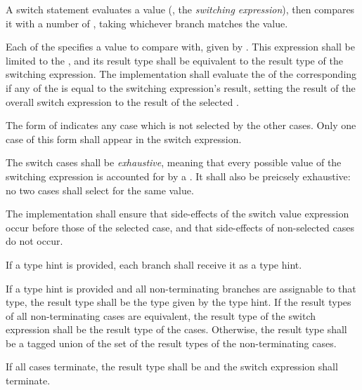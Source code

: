 \specsubsubitem
A switch statement evaluates a value (, the
\textit{switching expression}), then compares it with a number of
, taking whichever branch matches the value.

\specsubsubitem
Each of the  specifies a value to compare with, given
by . This expression shall be limited to the
, and its result type shall be
equivalent to the result type of the switching expression. The implementation
shall evaluate the  of the corresponding
 if any of the  is equal to
the switching expression's result, setting the result of the overall switch
expression to the result of the selected .

\specsubsubitem
The \terminal{*} form of  indicates any case which is
not selected by the other cases. Only one case of this form shall appear in the
switch expression.

\specsubsubitem
The switch cases shall be \textit{exhaustive}, meaning that every possible
value of the switching expression is accounted for by a
. It shall also be preicsely exhaustive: no two cases
shall select for the same value.

\specsubsubitem
The implementation shall ensure that side-effects of the switch value
expression occur before those of the selected case, and that side-effects of
non-selected cases do not occur.

\specsubsubitem
If a type hint is provided, each branch shall receive it as a type hint.

\specsubsubitem
If a type hint is provided and all non-terminating branches are assignable to
that type, the result type shall be the type given by the type hint. If the
result types of all non-terminating cases are equivalent, the result type of
the switch expression shall be the result type of the cases. Otherwise, the
result type shall be a tagged union of the set of the result types of the
non-terminating cases.

If all cases terminate, the result type shall be  and the switch
expression shall terminate.


